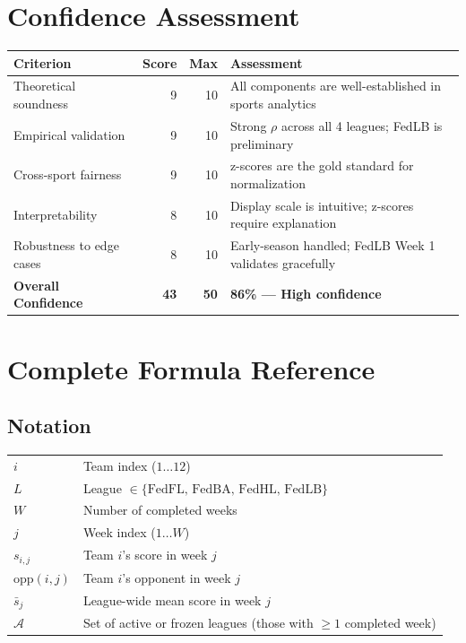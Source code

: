 \documentclass[11pt,a4paper]{article}
\begin{document}
\section{Confidence Assessment}

\begin{table}[H]
\centering
\begin{tabular}{@{}lrrp{7cm}@{}}
\toprule
\textbf{Criterion} & \textbf{Score} & \textbf{Max} & \textbf{Assessment}\\
\midrule
Theoretical soundness & 9 & 10 & All components are well-established in sports analytics\\
Empirical validation & 9 & 10 & Strong $\rho$ across all 4 leagues; FedLB is preliminary\\
Cross-sport fairness & 9 & 10 & z-scores are the gold standard for normalization\\
Interpretability & 8 & 10 & Display scale is intuitive; z-scores require explanation\\
Robustness to edge cases & 8 & 10 & Early-season handled; FedLB Week 1 validates gracefully\\
\midrule
\textbf{Overall Confidence} & \textbf{43} & \textbf{50} & \textbf{86\% --- High confidence}\\
\bottomrule
\end{tabular}
\end{table}


\appendix
\section{Complete Formula Reference}

\subsection{Notation}

\begin{tabular}{@{}ll@{}}
$i$ & Team index ($1 \ldots 12$)\\
$L$ & League $\in \{\text{FedFL, FedBA, FedHL, FedLB}\}$\\
$W$ & Number of completed weeks\\
$j$ & Week index ($1 \ldots W$)\\
$s_{i,j}$ & Team $i$'s score in week $j$\\
$\text{opp}(i,j)$ & Team $i$'s opponent in week $j$\\
$\bar{s}_j$ & League-wide mean score in week $j$\\
$\mathcal{A}$ & Set of active or frozen leagues (those with $\geq 1$ completed week)\\
\end{tabular}
\end{document}
